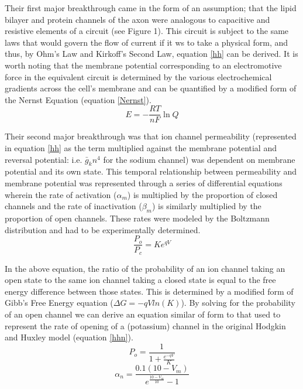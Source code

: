 \par Their first major breakthrough came in the form of an assumption; that the lipid bilayer and protein channels of the axon were analogous to capacitive and resistive elements of a circuit (see Figure 1). This circuit is subject to the same laws that would govern the flow of current if it ws to take a physical form, and thus, by Ohm's Law and Kirkoff's Second Law, equation \ref{hh} can be derived. It is worth noting that the membrane potential corresponding to an electromotive force in the equivalent circuit is determined by the various electrochemical gradients across the cell's membrane and can be quantified by a modified form of the Nernst Equation (equation \ref{Nernst}). 
\begin{equation}\label{Nernst}
E = -\frac{RT}{nF} \ln Q
\end{equation}
\par Their second major breakthrough was that ion channel permeability (represented in equation \ref{hh} as the term multiplied against the membrane potential and reversal potential: i.e. $\bar{g}_k n^4$ for the sodium channel) was dependent on membrane potential and its own state. This temporal relationship between permeability and membrane potential was represented through a series of differential equations wherein the rate of activation ($\alpha_m$) is multiplied by the proportion of closed channels and the rate of inactivation ($\beta_m$) is similarly multiplied by the proportion of open channels. These rates were modeled by the Boltzmann distribution and had to be experimentally determined.
\begin{equation}
\frac{P_o}{P_c}  = K e^{qV}
\end{equation}
\par In the above equation, the ratio of the probability of an ion channel taking an open state to the same ion channel taking a closed state is equal to the free energy difference between those states. This is determined by a modified form of Gibb's Free Energy equation ($\Delta G = -qVln(K)$). By solving for the probability of an open channel we can derive an equation similar of form to that used to represent the rate of opening of a (potassium) channel in the original Hodgkin and Huxley model (equation \ref{hhn}).
\begin{equation}
P_o = \frac{1}{1 + \frac{e^{-qV}}{K}}
\end{equation}
\begin{equation}\label{hhn}
\alpha_{n} = \frac{0.1(10-V_m)}{e^{\frac{10-V_m}{10}}-1}
\end{equation}
